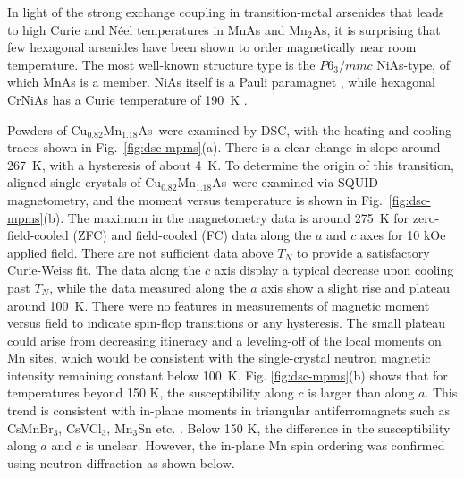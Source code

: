 \documentclass[letterpaper,10pt,doublespacing,edeposit]{uiucthesis2020}
\newcommand*{\cumnas}{Cu$_{0.82}$Mn$_{1.18}$As}
\begin{document}
\begin{mainmatter}
In light of the strong exchange coupling in transition-metal arsenides that leads to high Curie and N\'{e}el temperatures in MnAs and Mn$_2$As, it is surprising that few hexagonal arsenides have been shown to order magnetically near room temperature. The most well-known structure type is the $P6_3/mmc$  NiAs-type, of which MnAs is a member. NiAs itself is a Pauli paramagnet \cite{nozue_specific_1997}, while hexagonal CrNiAs has a Curie temperature of 190~K \cite{stadnik_magnetization_2008}.

Powders of \cumnas\ were examined by DSC, with the heating and cooling traces shown in Fig.\ \ref{fig:dsc-mpms}(a).
There is a clear change in slope around 267~K, with a hysteresis of about 4~K.
To determine the origin of this transition, aligned single crystals of \cumnas\ were examined via SQUID magnetometry, and the moment versus temperature is shown in Fig.\ \ref{fig:dsc-mpms}(b).
The maximum in the magnetometry data is around 275~K for zero-field-cooled (ZFC) and field-cooled (FC) data along the $a$ and $c$ axes {\color{black} for 10 kOe applied field}. There are not sufficient data above $T_N$ to provide a satisfactory Curie-Weiss fit.
The data along the $c$ axis display a typical decrease upon cooling past $T_N$, while the data measured along the $a$ axis show a slight rise and plateau around 100~K.
There were no features in measurements of magnetic moment versus field to indicate spin-flop transitions or any hysteresis. The small plateau could arise from decreasing itineracy and a leveling-off of the local moments on Mn sites, which would be consistent with the single-crystal neutron magnetic intensity remaining constant below 100~K. 
{\color{black}  Fig. \ref{fig:dsc-mpms}(b) shows that for temperatures beyond 150 K, the susceptibility along $c$ is larger than along $a$. This trend is consistent with in-plane moments in triangular antiferromagnets such as CsMnBr$_3$, CsVCl$_3$, Mn$_3$Sn etc. \cite{Brown_1990,Kotyuzhanskii1991,Hirakawa1983,Duan2015}. Below 150 K, the difference in the susceptibility along $a$ and $c$ is unclear. However, the in-plane Mn spin ordering was confirmed using neutron diffraction as shown below.}



\end{mainmatter}
\end{document}
